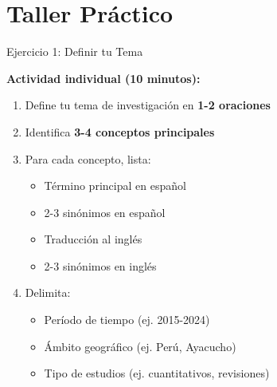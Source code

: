 \documentclass[11pt,aspectratio=169]{beamer}
\begin{document}

%
%
%
%

\section{Taller Práctico}

\begin{frame}{Ejercicio 1: Definir tu Tema}

	\textbf{Actividad individual (10 minutos):}


	\begin{enumerate}
		\item Define tu tema de investigación en \textbf{1-2 oraciones}

		\item Identifica \textbf{3-4 conceptos principales}

		\item Para cada concepto, lista:
		      \begin{itemize}
			      \item Término principal en español
			      \item 2-3 sinónimos en español
			      \item Traducción al inglés
			      \item 2-3 sinónimos en inglés
		      \end{itemize}

		\item Delimita:
		      \begin{itemize}
			      \item Período de tiempo (ej. 2015-2024)
			      \item Ámbito geográfico (ej. Perú, Ayacucho)
			      \item Tipo de estudios (ej. cuantitativos, revisiones)
		      \end{itemize}
	\end{enumerate}
\end{frame}
\end{document}
